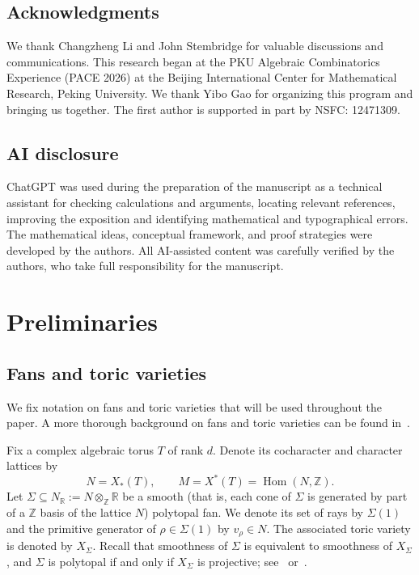 \documentclass[12pt]{amsart}
\theoremstyle{remark}
\begin{document}
\subsection*{Acknowledgments}
We thank Changzheng Li and John Stembridge for valuable discussions and communications. 
This research began at the PKU Algebraic Combinatorics Experience (PACE 2026)
at the Beijing International Center for Mathematical Research, Peking
University. We thank Yibo Gao for organizing this program and bringing us
together. The first author is supported in part by NSFC: 12471309.

\subsection*{AI disclosure}
ChatGPT was used during the preparation of the manuscript as a technical assistant for checking calculations and arguments, locating relevant references, improving the exposition and identifying mathematical and typographical errors. The mathematical ideas, conceptual framework, and proof strategies were developed by the authors. All AI-assisted content was carefully verified by the authors, who take full responsibility for the manuscript.

\section{Preliminaries}\label{sec:2}

\subsection{Fans and toric varieties}
We fix notation on fans and toric varieties that will be used throughout the paper. A more thorough background on fans and toric varieties can be found in~\cite{CLS,Fulton}.

Fix a complex algebraic torus $T$ of rank $d$. 
Denote its cocharacter and character lattices by 
$$N=X_*(T),\qquad M=X^*(T)=\operatorname{Hom}(N,\mathbb{Z}).$$
Let $\Sigma\subseteq N_{\mathbb{R}}:=N\otimes_\mathbb{Z}\mathbb{R}$ be a smooth (that is, each cone of $\Sigma$ is generated by part of a $\mathbb{Z}$ basis of the lattice $N$) polytopal fan.  We denote its set of
rays by $\Sigma(1)$ and the primitive generator of
$\rho\in\Sigma(1)$ by $v_\rho\in N$.  The associated toric variety is denoted
by $X_\Sigma$. 
Recall that smoothness of $\Sigma$ is equivalent to smoothness
of $X_\Sigma$, and $\Sigma$ is polytopal if and only if $X_\Sigma$ is
projective; see~\cite[Chapters~3 and~6]{CLS} or~\cite{Fulton}.
\end{document}
